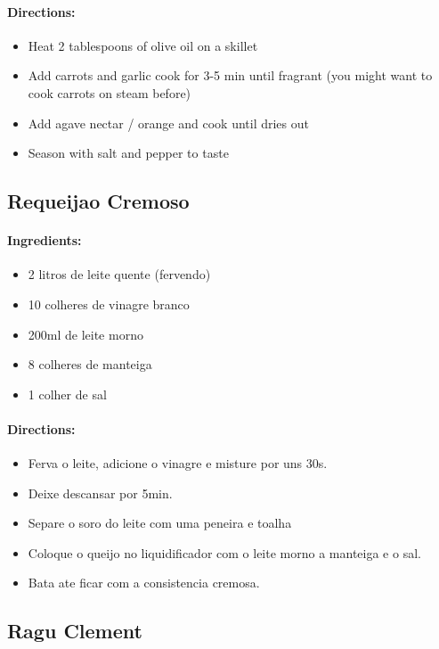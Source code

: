 \documentclass{article}
\begin{document}
\paragraph{Directions:}
\begin{itemize}
	\item  Heat 2 tablespoons of olive oil on a skillet
	\item Add carrots and garlic cook for 3-5 min until fragrant (you might want to cook carrots on steam before)
	\item Add agave nectar / orange and cook until dries out
	\item Season with salt and pepper to taste
\end{itemize}

\subsection{Requeijao Cremoso}

\paragraph{Ingredients:}

\begin{itemize}
	\item 2 litros de leite quente (fervendo)
	\item 10 colheres de vinagre branco
	\item 200ml de leite morno
	\item 8 colheres de manteiga
	\item 1 colher de sal
\end{itemize}

\paragraph{Directions:}
\begin{itemize}
	\item Ferva o leite, adicione o vinagre e misture por uns 30s.
	\item Deixe descansar por 5min.
	\item Separe o soro do leite com uma peneira e toalha
	\item Coloque o queijo no liquidificador com o leite morno a manteiga e o sal.
	\item Bata ate ficar com a consistencia cremosa.
\end{itemize}

\subsection{Ragu Clement}
\end{document}
